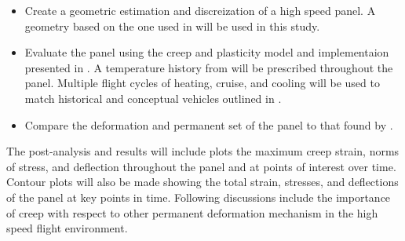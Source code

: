 \documentclass[conf]{new-aiaa}
\begin{document}
\begin{itemize}
  \item Create a geometric estimation and discreization of a high speed panel.
        A geometry based on the one used in 
        \cite{ culler_impact_of_FTS_coupling_on_response_prediction_hypersonic_skin_panels}
        will be used in this study.
  \item Evaluate the panel using the creep and plasticity model and implementaion presented in
        \cite{ li_simulation_of_finite_strain_inelastic_phenomena_governed_by_creep_and_plasticity}.
        A temperature history from 
        \cite{ culler_impact_of_FTS_coupling_on_response_prediction_hypersonic_skin_panels}
        will be prescribed throughout the panel. 
        Multiple flight cycles of heating, cruise, and cooling will be used
        to match historical and conceptual vehicles outlined in
        \cite{ kordes_structureal_heating_experiencs_on_the_x15_airplane,
               zuchowski_AVIATR_Predictive_capability_for_hypersonic_structural_response_and_life_prediction_phase_II}.
  \item Compare the deformation and permanent set of the panel to that 
        found by \cite{ culler_impact_of_FTS_coupling_on_response_prediction_hypersonic_skin_panels}.
\end{itemize}

\noindent
The post-analysis and results will include plots the maximum creep strain, norms of stress, 
and deflection throughout the panel and at points of interest over time. 
Contour plots will also be made showing the total strain, stresses, and deflections
of the panel at key points in time.
Following discussions include the importance of creep 
with respect to other permanent deformation mechanism 
in the high speed flight environment.



% 


\end{document}
